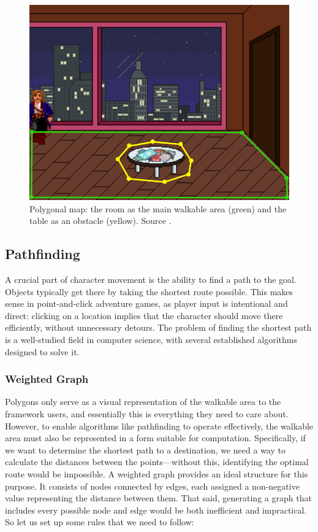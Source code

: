 \begin{figure}[H]
\centering
\includegraphics[width=.8\linewidth]{img/WS-polygons4.png}
\caption{Polygonal map: the room as the main walkable area (green) and the table as an obstacle (yellow). Source \cite{Uurloon1}.}
\label{fig:WS:Poly}
\end{figure}

\subsection{Pathfinding}
A crucial part of character movement is the ability to find a path to the goal. Objects typically get there by taking the shortest route possible. This makes sense in point-and-click adventure games, as player input is intentional and direct: clicking on a location implies that the character should move there efficiently, without unnecessary detours. The problem of finding the shortest path is a well-studied field in computer science, with several established algorithms designed to solve it. 

\subsubsection{Weighted Graph}
Polygons only serve as a visual representation of the walkable area to the framework users, and essentially this is everything they need to care about. However, to enable algorithms like pathfinding to operate effectively, the walkable area must also be represented in a form suitable for computation. Specifically, if we want to determine the shortest path to a destination, we need a way to calculate the distances between the points—without this, identifying the optimal route would be impossible. A weighted graph provides an ideal structure for this purpose. It consists of nodes connected by edges, each assigned a non-negative value representing the distance between them. That said, generating a graph that includes every possible node and edge would be both inefficient and impractical. So let us set up some rules that we need to follow:

